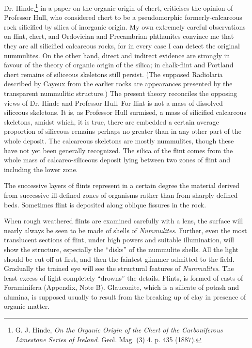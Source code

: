 \documentclass[a4paper, 12pt, oneside, landscape]{article}
\begin{document}
Dr. Hinde,\footnote{G. J. Hinde, \emph{On the Organic Origin of the Chert of the Carboniferous Limestone Series of Ireland}. Geol. Mag. (3) 4. p. 435 (1887).} in a paper on the organic origin of chert, criticises the opinion of Professor Hull, who considered chert to be a pseudomorphic formerly-calcareous rock silicified by silica of inorganic origin. My own extremely careful observations on flint, chert, and Ordovician and Precambrian phthanites convince me that they are all silicified calcareous rocks, for in every case I can detect the original nummulites. On the other hand, direct and indirect evidence are strongly in favour of the theory of organic origin of the silica; in chalk-flint and Portland chert remains of siliceous skeletons still persist. (The supposed Radiolaria described by Cayeux from the earlier rocks are appearances presented by the transparent nummulitic structure.) The present theory reconciles the opposing views of Dr. Hinde and Professor Hull. For flint is not a mass of dissolved siliceous skeletons. It is, as Professor Hull surmised, a mass of silicified calcareous skeletons, amidst which, it is true, there are embedded a certain average proportion of siliceous remains perhaps no greater than in any other part of the whole deposit. The calcareous skeletons are mostly nummulites, though these have not yet been generally recognized. The silica of the flint comes from the whole mass of calcareo-siliceous deposit lying between two zones of flint and including the lower zone.

The successive layers of flints represent in a certain degree the material derived from successive ill-defined zones of organisms rather than from sharply defined beds. Sometimes flint is deposited along oblique fissures in the rock.

When rough weathered flints are examined carefully with a lens, the surface will nearly always be seen to be made of shells of \emph{Nummulites}. Further, even the most translucent sections of flint, under high powers and suitable illumination, will show the structure, especially the ``disks'' of the nummulite shells. All the light should be cut off at first, and then the faintest glimmer admitted to the field. Gradually the trained eye will see the structural features of \emph{Nummulites}. The least excess of light completely ``drowns'' the details. Flints, is formed of casts of Foraminifera (Appendix, Note B). Glauconite, which is a silicate of potash and alumina, is supposed usually to result from the breaking up of clay in presence of organic matter.
\end{document}
